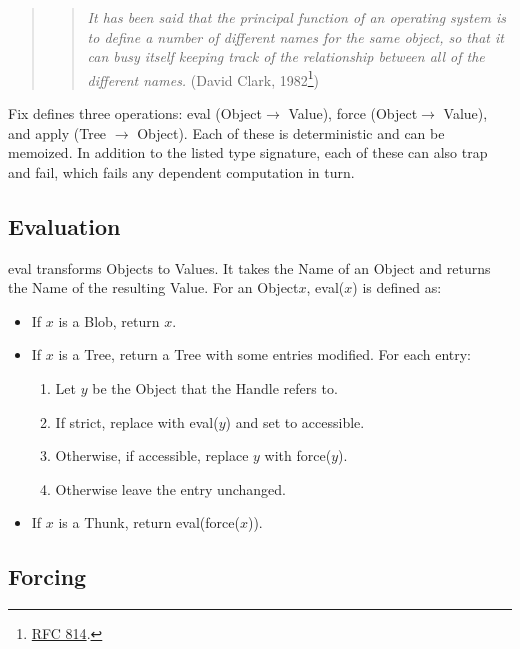 \documentclass{article}
\newcommand{\blob}{\textrm{Blob}\xspace}
\newcommand{\valuex}{\textrm{Value}\xspace}
\newcommand{\valuexs}{\textrm{Value}s\xspace}
\newcommand{\object}{\textrm{Object}\xspace}
\newcommand{\objects}{\textrm{Object}s\xspace}
\newcommand{\thunk}{\textrm{Thunk}\xspace}
\newcommand{\name}{\textrm{Name}\xspace}
\newcommand{\tree}{\textrm{Tree}\xspace}
\newcommand{\handle}{\textrm{Handle}\xspace}
\newcommand{\eval}{\textsf{eval}}
\newcommand{\apply}{\textsf{apply}}
\newcommand{\force}{\textsf{force}}
\begin{document}
\begin{quote}
\begin{quote}
\textit{It has been said that the principal function of an operating system
is to define a number of different names for the same object, so that it
can  busy  itself  keeping  track of the relationship between all of the
different names.} (David Clark, 1982\footnote{\href{https://www.rfc-editor.org/rfc/rfc814.html}{RFC 814}.})
\end{quote}
\end{quote}

Fix defines three operations: \eval{} (\object $\rightarrow$ \valuex),
\force{} (\object $\rightarrow$ \valuex), and \apply{} (\tree
$\rightarrow$ \object). Each of these is deterministic and can be
memoized. In addition to the listed type signature, each of these can
also trap and fail, which fails any dependent computation in turn.

\subsection{Evaluation}

\eval\xspace transforms \objects to \valuexs. It takes the \name of
an \object and returns the \name of the resulting \valuex. For an
\object $x$, \eval($x$) is defined as:
\begin{itemize}[itemsep=0pt]
\item If $x$ is a \blob, return $x$.

\item If $x$ is a \tree, return a \tree with some entries modified. For each entry:
  \begin{enumerate}[topsep=0pt, itemsep=0pt]
    \item Let $y$ be the \object that the \handle refers to.
    \item If strict, replace with \eval($y$) and set to accessible.
    \item Otherwise, if accessible, replace $y$ with \force($y$).
    \item Otherwise leave the entry unchanged.
  \end{enumerate}

\item If $x$ is a \thunk, return \eval(\force($x$)).
\end{itemize}

\subsection{Forcing}
\end{document}
